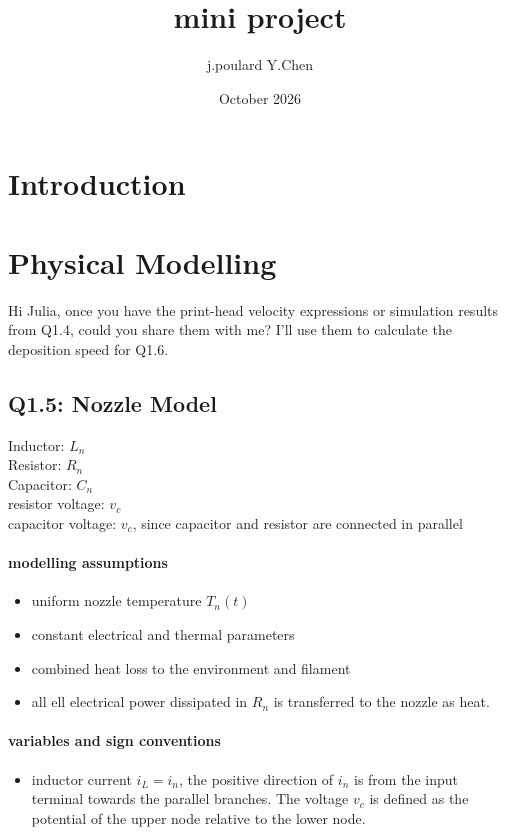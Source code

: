 \documentclass{article}
\title{mini project}
\author{j.poulard Y.Chen }
\date{October 2026}
\begin{document}
\maketitle

\section{Introduction}
\section{Physical Modelling}
Hi Julia, once you have the print-head velocity expressions or simulation results from Q1.4, could you share them with me? I’ll use them to calculate the deposition speed for Q1.6.

\subsection*{Q1.5: Nozzle Model}
Inductor: $L_n$ \\ Resistor: $R_n$ \\Capacitor: $C_n$
\\resistor voltage: $v_c$ \\capacitor voltage: $v_c$, since capacitor and resistor are connected in parallel
\paragraph{modelling assumptions}
\begin{itemize}
\item uniform nozzle temperature $T_n(t)$
\item constant electrical and thermal parameters
\item combined heat loss to the environment and filament
\item all ell electrical power dissipated in $R_n$ is transferred to the nozzle as heat.
\end{itemize}

\paragraph{variables and sign conventions}
\begin{itemize}
\item inductor current $i_L=i_n$, the positive direction of $i_n$ is from the input terminal towards the parallel branches. The voltage $v_c$ is defined as the potential of the upper node relative to the lower node.
\end{itemize}
\end{document}
